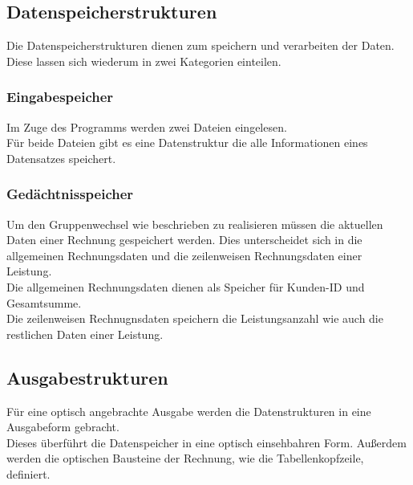 \subsection{Datenspeicherstrukturen}\label{subsubsec:dynamische-datenstrukturen}
Die Datenspeicherstrukturen dienen zum speichern und verarbeiten der Daten.\\
Diese lassen sich wiederum in zwei Kategorien einteilen.\\

\subsubsection{Eingabespeicher}\label{subsubsubsec:eingabespeicher}
Im Zuge des Programms werden zwei Dateien eingelesen.\\
Für beide Dateien gibt es eine Datenstruktur die alle Informationen eines Datensatzes speichert.\\

\subsubsection{Gedächtnisspeicher}\label{subsubsubsubsec:gedaechtnisspeicher}
Um den Gruppenwechsel wie beschrieben zu realisieren müssen die aktuellen Daten einer Rechnung gespeichert werden. Dies unterscheidet sich in die allgemeinen Rechnungsdaten und die zeilenweisen Rechnungsdaten einer Leistung.\\
Die allgemeinen Rechnungsdaten dienen als Speicher für Kunden-ID und Gesamtsumme.\\
Die zeilenweisen Rechnugnsdaten speichern die Leistungsanzahl wie auch die restlichen Daten einer Leistung.\\

\subsection{Ausgabestrukturen}\label{subsubsec:ausgabestrukturen}
Für eine optisch angebrachte Ausgabe werden die Datenstrukturen in eine Ausgabeform gebracht.\\
Dieses überführt die Datenspeicher in eine optisch einsehbahren Form. Außerdem werden die optischen Bausteine der Rechnung, wie die Tabellenkopfzeile, definiert.\\